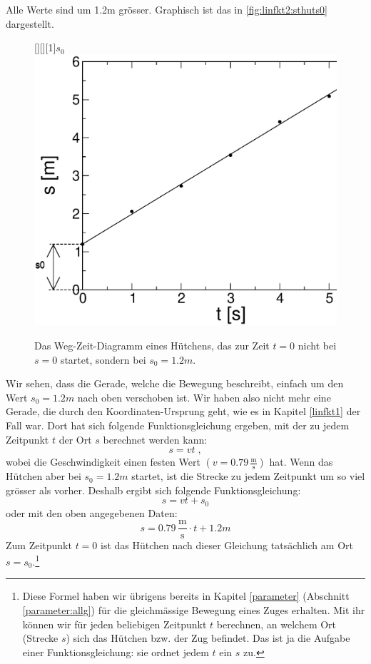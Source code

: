 \documentclass[%
11pt,%
twoside,%
titlepage,%
german,%
headsepline%
]{scrartcl}
\newcommand{\ufrac}[2]{\ensuremath{\,\frac{\mathrm{#1}}{\mathrm{#2}}}}
\begin{document}
{Alle Werte sind um 1.2\unit{m} gr\"osser. Graphisch ist das in \ref{fig:linfkt2:sthuts0} dargestellt.

\begin{figure}[b!]
  \centering
  [][][1]{$s_0$}
  \includegraphics[width=\columnwidth]{pictures/sthuts0.eps}
  \caption{Das Weg-Zeit-Diagramm eines H\"utchens, das zur Zeit $t=0$ nicht bei $s=0$ startet, sondern bei $s_0=1.2\unit{m}$.}
  \label{fig:linfkt2:sthuts}
\end{figure}

Wir sehen, dass die Gerade, welche die Bewegung beschreibt, einfach um den Wert $s_0=1.2\unit{m}$ nach oben verschoben ist. Wir haben also nicht mehr eine Gerade, die durch den Koordinaten-Ursprung geht, wie es in Kapitel \ref{linfkt1} der Fall war. Dort hat sich folgende Funktionsgleichung ergeben, mit der zu jedem Zeitpunkt $t$ der Ort $s$ berechnet werden kann:
\begin{displaymath}
  s = v t\;,
\end{displaymath}
wobei die Geschwindigkeit einen festen Wert $\left(v=0.79\ufrac{m}{s}\right)$ hat. Wenn das H\"utchen aber bei $s_0=1.2\unit{m}$ startet, ist die Strecke zu jedem Zeitpunkt um so viel gr\"osser als vorher. Deshalb ergibt sich folgende Funktionsgleichung:
\begin{displaymath}
  s = v t + s_0
\end{displaymath}
oder mit den oben angegebenen Daten:
\begin{displaymath}
  s = 0.79\ufrac{m}{s}\cdot t + 1.2\unit{m}
\end{displaymath}
Zum Zeitpunkt $t=0$ ist das H\"utchen nach dieser Gleichung tats\"achlich am Ort $s=s_0$.\footnote{Diese Formel haben wir \"ubrigens bereits in Kapitel \ref{parameter} (Abschnitt \ref{parameter:allg}) f\"ur die gleichm\"assige Bewegung eines Zuges erhalten. Mit ihr k\"onnen wir f\"ur jeden beliebigen Zeitpunkt $t$ berechnen, an welchem Ort (Strecke $s$) sich das H\"utchen bzw. der Zug befindet. Das ist ja die Aufgabe einer Funktionsgleichung: sie ordnet jedem $t$ ein $s$ zu.}

}
\end{document}
